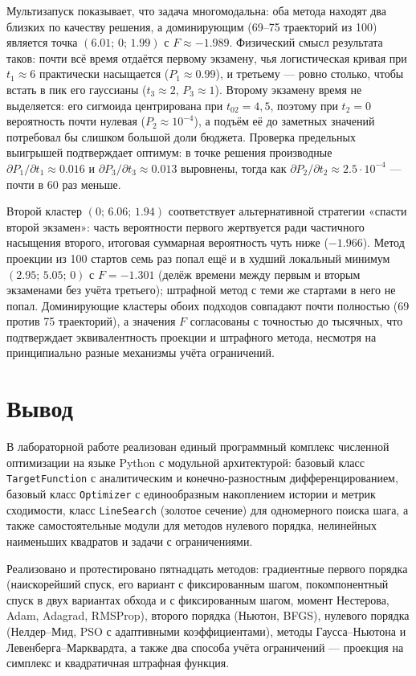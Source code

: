\documentclass[a4paper]{article}
\newcommand{\mainsection}[1]{%
    \phantomsection
    \section*{\centering\fontsize{16pt}{0pt}\selectfont\textbf{#1}}%
}
\begin{document}
Мультизапуск показывает, что задача многомодальна: оба метода находят два близких по качеству решения, а доминирующим (69–75 траекторий из 100) является точка $(6.01;\, 0;\, 1.99)$ с $F \approx -1.989$. Физический смысл результата таков: почти всё время отдаётся первому экзамену, чья логистическая кривая при $t_1 \approx 6$ практически насыщается ($P_1 \approx 0.99$), и третьему — ровно столько, чтобы встать в пик его гауссианы ($t_3 \approx 2$, $P_3 \approx 1$). Второму экзамену время не выделяется: его сигмоида центрирована при $t_{02} = 4{,}5$, поэтому при $t_2 = 0$ вероятность почти нулевая ($P_2 \approx 10^{-4}$), а подъём её до заметных значений потребовал бы слишком большой доли бюджета. Проверка предельных выигрышей подтверждает оптимум: в точке решения производные $\partial P_1 / \partial t_1 \approx 0.016$ и $\partial P_3 / \partial t_3 \approx 0.013$ выровнены, тогда как $\partial P_2 / \partial t_2 \approx 2.5\cdot10^{-4}$ — почти в 60 раз меньше.

Второй кластер $(0;\, 6.06;\, 1.94)$ соответствует альтернативной стратегии «спасти второй экзамен»: часть вероятности первого жертвуется ради частичного насыщения второго, итоговая суммарная вероятность чуть ниже ($-1.966$). Метод проекции из 100 стартов семь раз попал ещё и в худший локальный минимум $(2.95;\, 5.05;\, 0)$ с $F = -1.301$ (делёж времени между первым и вторым экзаменами без учёта третьего); штрафной метод с теми же стартами в него не попал. Доминирующие кластеры обоих подходов совпадают почти полностью (69 против 75 траекторий), а значения $F$ согласованы с точностью до тысячных, что подтверждает эквивалентность проекции и штрафного метода, несмотря на принципиально разные механизмы учёта ограничений.

\newpage

\label{sec:conclusion}
\mainsection{Вывод}

В лабораторной работе реализован единый программный комплекс численной оптимизации на языке Python с модульной архитектурой: базовый класс \texttt{TargetFunction} с аналитическим и конечно-разностным дифференцированием, базовый класс \texttt{Optimizer} с единообразным накоплением истории и метрик сходимости, класс \texttt{LineSearch} (золотое сечение) для одномерного поиска шага, а также самостоятельные модули для методов нулевого порядка, нелинейных наименьших квадратов и задачи с ограничениями.

Реализовано и протестировано пятнадцать методов: градиентные первого порядка (наискорейший спуск, его вариант с фиксированным шагом, покомпонентный спуск в двух вариантах обхода и с фиксированным шагом, момент Нестерова, Adam, Adagrad, RMSProp), второго порядка (Ньютон, BFGS), нулевого порядка (Нелдер–Мид, PSO с адаптивными коэффициентами), методы Гаусса–Ньютона и Левенберга–Марквардта, а также два способа учёта ограничений — проекция на симплекс и квадратичная штрафная функция.
\end{document}
